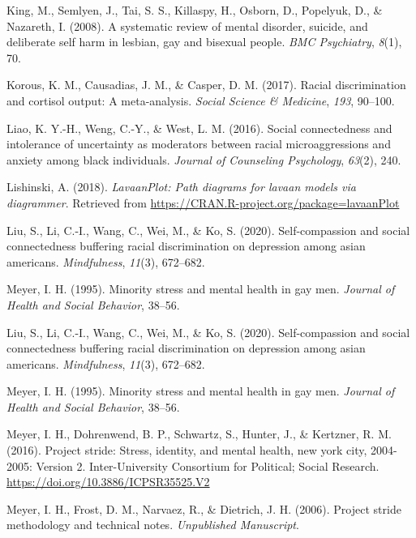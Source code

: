 \documentclass[
  english,
  man,floatsintext]{apa6}
\begin{document}
\begin{CSLReferences}{1}{0}
\leavevmode\hypertarget{ref-king2008}{}%
King, M., Semlyen, J., Tai, S. S., Killaspy, H., Osborn, D., Popelyuk, D., \& Nazareth, I. (2008). A systematic review of mental disorder, suicide, and deliberate self harm in lesbian, gay and bisexual people. \emph{BMC Psychiatry}, \emph{8}(1), 70.

\leavevmode\hypertarget{ref-korous2017}{}%
Korous, K. M., Causadias, J. M., \& Casper, D. M. (2017). Racial discrimination and cortisol output: A meta-analysis. \emph{Social Science \& Medicine}, \emph{193}, 90--100.

\leavevmode\hypertarget{ref-liao2016}{}%
Liao, K. Y.-H., Weng, C.-Y., \& West, L. M. (2016). Social connectedness and intolerance of uncertainty as moderators between racial microaggressions and anxiety among black individuals. \emph{Journal of Counseling Psychology}, \emph{63}(2), 240.

\leavevmode\hypertarget{ref-R-lavaanPlot}{}%
Lishinski, A. (2018). \emph{LavaanPlot: Path diagrams for lavaan models via diagrammer}. Retrieved from \url{https://CRAN.R-project.org/package=lavaanPlot}

\leavevmode\hypertarget{ref-liu2020}{}%
Liu, S., Li, C.-I., Wang, C., Wei, M., \& Ko, S. (2020). Self-compassion and social connectedness buffering racial discrimination on depression among asian americans. \emph{Mindfulness}, \emph{11}(3), 672--682.

\leavevmode\hypertarget{ref-meyer1995}{}%
Meyer, I. H. (1995). Minority stress and mental health in gay men. \emph{Journal of Health and Social Behavior}, 38--56.

\leavevmode\hypertarget{ref-liu2020}{}%
Liu, S., Li, C.-I., Wang, C., Wei, M., \& Ko, S. (2020). Self-compassion and social connectedness buffering racial discrimination on depression among asian americans. \emph{Mindfulness}, \emph{11}(3), 672--682.

\leavevmode\hypertarget{ref-meyer1995}{}%
Meyer, I. H. (1995). Minority stress and mental health in gay men. \emph{Journal of Health and Social Behavior}, 38--56.

\leavevmode\hypertarget{ref-projectstride}{}%
Meyer, I. H., Dohrenwend, B. P., Schwartz, S., Hunter, J., \& Kertzner, R. M. (2016). Project stride: Stress, identity, and mental health, new york city, 2004-2005: Version 2. Inter-University Consortium for Political; Social Research. \url{https://doi.org/10.3886/ICPSR35525.V2}

\leavevmode\hypertarget{ref-projectstridemethod}{}%
Meyer, I. H., Frost, D. M., Narvaez, R., \& Dietrich, J. H. (2006). Project stride methodology and technical notes. \emph{Unpublished Manuscript}.


\end{CSLReferences}
\end{document}
